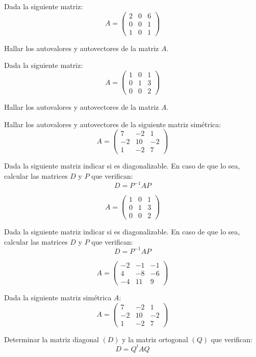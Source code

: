 \begin{Ejer}
Dada la siguiente matriz:
\[
A=
\begin{pmatrix}
2 & 0 & 6\\
0 & 0 & 1\\
1 & 0 & 1
\end{pmatrix}
\]

Hallar los autovalores y autovectores de la matriz $A$.
\end{Ejer}

\begin{Ejer}
Dada la siguiente matriz:
\[
A=
\begin{pmatrix}
1 & 0 & 1\\
0 & 1 & 3\\
0 & 0 & 2
\end{pmatrix}
\]

Hallar los autovalores y autovectores de la matriz $A$.
\end{Ejer}


\begin{Ejer}

Hallar los autovalores y autovectores de la siguiente matriz simétrica:
\[
A=
\begin{pmatrix}
7 & -2 & 1\\
-2 & 10 & -2\\
1 & -2 & 7
\end{pmatrix}
\]
\end{Ejer}

\begin{Ejer}
Dada la siguiente matriz indicar si es diagonalizable. 
En caso de que lo sea, calcular las matrices $D$ y $P$ que verifican:
\[
D = P^{-1} A P
\]

\[
A=
\begin{pmatrix}
1 & 0 & 1\\
0 & 1 & 3\\
0 & 0 & 2
\end{pmatrix}
\]

Dada la siguiente matriz indicar si es diagonalizable. 
En caso de que lo sea, calcular las matrices $D$ y $P$ que verifican:
\[
D = P^{-1} A P
\]

\[
A=
\begin{pmatrix}
-2 & -1 & -1\\
4 & -8 & -6\\
-4 & 11 & 9
\end{pmatrix}
\]
\end{Ejer}

\begin{Ejer}
Dada la siguiente matriz simétrica $A$:
\[
A=
\begin{pmatrix}
7 & -2 & 1\\
-2 & 10 & -2\\
1 & -2 & 7
\end{pmatrix}
\]

Determinar la matriz diagonal $(D)$ y la matriz ortogonal $(Q)$ que verifican:
\[
D = Q^t A Q
\]
\end{Ejer}


